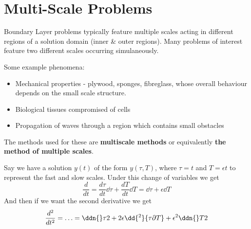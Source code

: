 \documentclass{/home/janmebows/Documents/LatexTemplates/myassignment}
\begin{document}





\section{Multi-Scale Problems}

Boundary Layer problems typically feature multiple scales acting in different regions of a solution domain (inner \& outer regions). Many problems of interest feature two different scales occurring simulaneously. 

Some example phenomena:
\begin{itemize}
     \item Mechanical properties - plywood, sponges, fibreglass, whose overall behaviour depends on the small scale structure.
     \item Biological tissues compromised of cells
     \item Propagation of waves through a region which contains small obstacles
\end{itemize} 


The methods used for these are \textbf{multiscale methods} or equivalently \textbf{the method of multiple scales}.

Say we have a solution $y(t)$ of the form $y(\tau,T)$, where $\tau =t$ and $T = \epsilon t$ to represent the fast and slow scales. Under this change of variables we get
\[\frac{d}{dt} = \frac{d\tau}{dt} \dd{}\tau + \frac{dT}{dt} \dd{}T = \dd{}\tau + \epsilon \dd{}T\]
And then if we want the second derivative we get
\[\frac{d^2}{dt^2} = \ldots = \ddn{}\tau2 + 2\epsilon \dd{^2}{\tau\partial T} + \epsilon^2 \ddn{}T2\]
\end{document}
